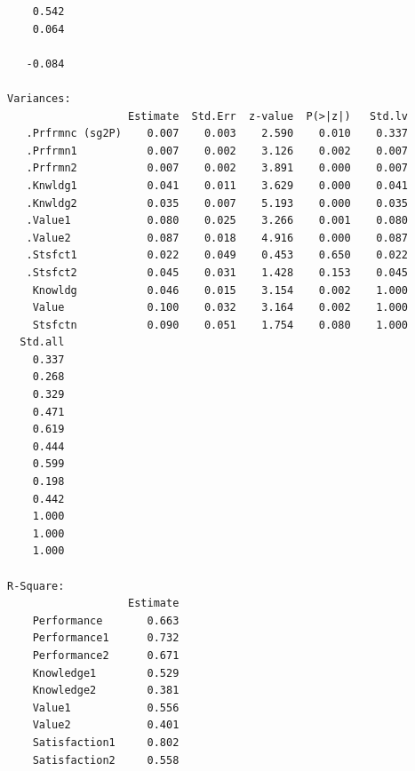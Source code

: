 \begin{verbatim}
    0.542
    0.064
         
   -0.084

Variances:
                   Estimate  Std.Err  z-value  P(>|z|)   Std.lv
   .Prfrmnc (sg2P)    0.007    0.003    2.590    0.010    0.337
   .Prfrmn1           0.007    0.002    3.126    0.002    0.007
   .Prfrmn2           0.007    0.002    3.891    0.000    0.007
   .Knwldg1           0.041    0.011    3.629    0.000    0.041
   .Knwldg2           0.035    0.007    5.193    0.000    0.035
   .Value1            0.080    0.025    3.266    0.001    0.080
   .Value2            0.087    0.018    4.916    0.000    0.087
   .Stsfct1           0.022    0.049    0.453    0.650    0.022
   .Stsfct2           0.045    0.031    1.428    0.153    0.045
    Knowldg           0.046    0.015    3.154    0.002    1.000
    Value             0.100    0.032    3.164    0.002    1.000
    Stsfctn           0.090    0.051    1.754    0.080    1.000
  Std.all
    0.337
    0.268
    0.329
    0.471
    0.619
    0.444
    0.599
    0.198
    0.442
    1.000
    1.000
    1.000

R-Square:
                   Estimate
    Performance       0.663
    Performance1      0.732
    Performance2      0.671
    Knowledge1        0.529
    Knowledge2        0.381
    Value1            0.556
    Value2            0.401
    Satisfaction1     0.802
    Satisfaction2     0.558
\end{verbatim}


\label{app:bibliography} %

\manualmark
\markboth{\textsc{\bibname}}{\textsc{\bibname}}





\nocite{*}

%




